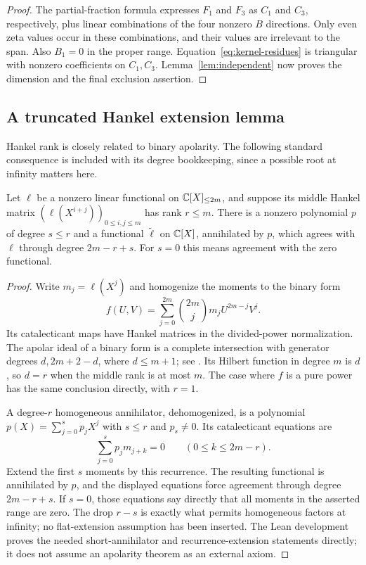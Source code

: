 \begin{proof}
The partial-fraction formula expresses $F_1$ and $F_3$ as $C_1$ and
$C_3$, respectively, plus linear combinations of the four nonzero $B$
directions.  Only even zeta values occur in these combinations, and
their values are irrelevant to the span.  Also $B_1=0$ in the proper
range.  Equation~\eqref{eq:kernel-residues} is triangular with nonzero
coefficients on $C_1,C_3$.  Lemma~\ref{lem:independent} now proves the
dimension and the final exclusion assertion.
\end{proof}

\subsection{A truncated Hankel extension lemma}
Hankel rank is closely related to binary apolarity. The following standard
consequence is included with
its degree bookkeeping, since a possible root at infinity matters here.
\begin{lemma}\label{lem:hankel}
Let $\ell$ be a nonzero linear functional on $\mathbb C[X]_{\le2m}$, and
suppose its middle Hankel matrix $(\ell(X^{i+j}))_{0\le i,j\le m}$
has rank $r\le m$.  There is a nonzero polynomial $p$ of degree
$s\le r$ and a functional $\widetilde\ell$ on $\mathbb C[X]$, annihilated
by $p$, which agrees with $\ell$ through degree $2m-r+s$.
For $s=0$ this means agreement with the zero functional.
\end{lemma}
\begin{proof}
Write $m_j=\ell(X^j)$ and homogenize the moments to the binary form
\[
 f(U,V)=\sum_{j=0}^{2m}\binom{2m}{j}m_jU^{2m-j}V^j.
\]
Its catalecticant maps have Hankel matrices in the divided-power
normalization.  The apolar ideal of a binary form is a complete
intersection with generator degrees $d,2m+2-d$, where $d\le m+1$;
see \cite[Proposition 1.7]{BS}.  Its Hilbert function in degree $m$
is $d$, so $d=r$ when the middle rank is at most $m$.  The case where
$f$ is a pure power has the same conclusion directly, with $r=1$.

A degree-$r$ homogeneous annihilator, dehomogenized, is a polynomial
$p(X)=\sum_{j=0}^sp_jX^j$ with $s\le r$ and $p_s\ne0$.  Its
catalecticant equations are
\[
 \sum_{j=0}^sp_jm_{j+k}=0\qquad(0\le k\le2m-r).
\]
Extend the first $s$ moments by this recurrence.  The resulting
functional is annihilated by $p$, and the displayed equations force
agreement through degree $2m-r+s$.  If $s=0$, those equations say
directly that all moments in the asserted range are zero.  The drop
$r-s$ is exactly what permits homogeneous factors at infinity; no
flat-extension assumption has been inserted. The Lean development proves
the needed short-annihilator and recurrence-extension statements directly;
it does not assume an apolarity theorem as an external axiom.
\end{proof}

